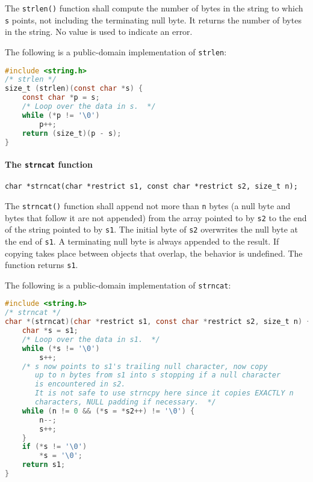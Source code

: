 The \texttt{strlen()} function shall compute the number of bytes in the string
to which \texttt{s} points, not including the terminating null byte.  It
returns the number of bytes in the string. No value is used to indicate an
error.

The following is a public-domain implementation of \texttt{strlen}:

\lstset{basicstyle=\scriptsize, numbers=left, captionpos=b, tabsize=4}
\begin{lstlisting}[caption=Section \thesection listing \arabic{stringcnt},language={C},
breaklines=true,xleftmargin=15pt,label=lst:section\thesection listing\arabic{stringcnt}]
#include <string.h>
/* strlen */
size_t (strlen)(const char *s) {
	const char *p = s;
	/* Loop over the data in s.  */
	while (*p != '\0')
		p++;
	return (size_t)(p - s);
}
\end{lstlisting}

\paragraph{The \texttt{strncat} function}
\texttt{char *strncat(char *restrict s1, const char *restrict s2, size\_t n);}

The \texttt{strncat()} function shall append not more than \texttt{n} bytes (a
null byte and bytes that follow it are not appended) from the array pointed to
by \texttt{s2} to the end of the string pointed to by \texttt{s1}. The initial
byte of \texttt{s2} overwrites the null byte at the end of \texttt{s1}. A
terminating null byte is always appended to the result. If copying takes place
between objects that overlap, the behavior is undefined. The function returns
\texttt{s1}.

The following is a public-domain implementation of \texttt{strncat}:
\lstset{basicstyle=\scriptsize, numbers=left, captionpos=b, tabsize=4}
\begin{lstlisting}[caption=Section \thesection listing \arabic{stringcnt},language={C},
breaklines=true,xleftmargin=15pt,label=lst:section\thesection listing\arabic{stringcnt}]
#include <string.h>
/* strncat */
char *(strncat)(char *restrict s1, const char *restrict s2, size_t n) {
	char *s = s1;
	/* Loop over the data in s1.  */
	while (*s != '\0')
		s++;
	/* s now points to s1's trailing null character, now copy
	   up to n bytes from s1 into s stopping if a null character
	   is encountered in s2.
	   It is not safe to use strncpy here since it copies EXACTLY n
	   characters, NULL padding if necessary.  */
	while (n != 0 && (*s = *s2++) != '\0') {
		n--;
		s++;
	}
	if (*s != '\0')
		*s = '\0';
	return s1;
}
\end{lstlisting}

